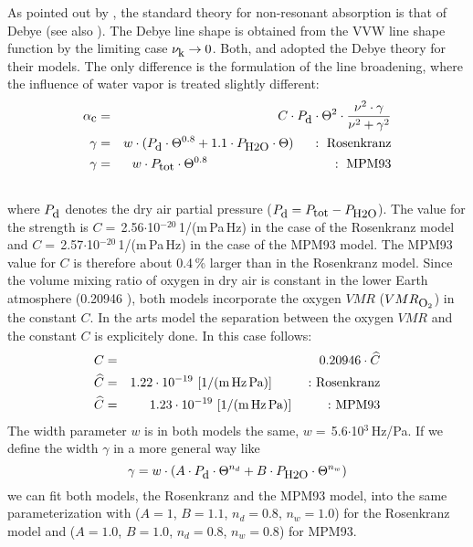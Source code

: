 \label{levelc:o2cont}
As pointed out by \citet{vv:87}, the standard theory for
non-resonant absorption is that of Debye (see also \citet{townes:55}). 
The Debye line shape is obtained from the VVW line shape function 
by the limiting case $\nu_{\mbox{\rm \small k}} \rightarrow 0$.
Both, \citet{liebeetal:93} and \citet{pwr:93} adopted the
Debye theory for their models. The only difference is the formulation
of the line broadening, where the influence of water vapor is treated 
slightly different: 
\begin{eqnarray}
  \label{eq:abs_cont_pwr_o2}
  \alphac &=&  C \cdot \pda \cdot \Theta^2 \cdot 
             \frac{\nu^2 \cdot \gamma}{\nu^2+\gamma^2}\\
  \label{eq:abs_cont_pwr_o2_1}
  \gamma &=&  w \cdot (\pda\cdot \Theta^{0.8} + 1.1 \cdot \phzo \cdot
  \Theta)\hspace*{5mm}:~\mbox{Rosenkranz}\\
  \label{eq:abs_cont_pwr_o2_2}
  \gamma &=&  w \cdot \ptot \cdot \Theta^{0.8}\hspace*{34mm}:~\mbox{MPM93}\\
\nonumber
\end{eqnarray}
where $P_{\mbox{\rm \small d}}$ denotes the dry air partial pressure ($P_{\mbox{\rm \small d}}=P_{\mbox{\rm \small tot}}-P_{\mbox{\rm \small H2O}}$). 
The value for the strength is $C =$\,2.56$\cdot$10$^{-20}$\,1/(m\,Pa\,Hz) 
in the case of the Rosenkranz model and 
$C =$\,2.57$\cdot$10$^{-20}$\,1/(m\,Pa\,Hz) in the case of the MPM93 model.
The MPM93 value for $C$ is therefore about 0.4\,\% larger than in the 
Rosenkranz model. Since the volume mixing ratio of oxygen in dry air
is constant in the lower Earth atmosphere (0.20946 \citep{goody:95}), 
both models incorporate the oxygen $VMR$ ($VMR_{\mbox{\rm \small O}_{2}}$) in the 
constant $C$. In the arts model the separation between the oxygen
$VMR$ and the constant $C$ is explicitely done. In this case follows:
\begin{eqnarray} 
 \label{eq:o2cont_const_vmr_1}
 C &=& 0.20946 \cdot \widehat{C}\\
 \label{eq:o2cont_const_vmr_2}
 \widehat{C} &=& 1.22\cdot 10^{-19}~\mbox{[1/(m\,Hz\,Pa)]\hspace{10mm}:~Rosenkranz} \\
 \label{eq:o2cont_const_vmr_3}
 \widehat{C} &=& 1.23\cdot 10^{-19}~\mbox{[1/(m\,Hz\,Pa)]\hspace{10mm}:~MPM93} 
\end{eqnarray} 
The width parameter $w$ is in both models the same, 
$w =$\,5.6$\cdot$10$^{3}$\,Hz/Pa. If we define the width $\gamma$ in a more 
general way like
\begin{equation} 
 \label{eq:o2_cont_gamma_general}
 \gamma = w \cdot \left( A \cdot P_{\mbox{\rm \small d}}  \cdot \Theta^{n_d} + 
                   B \cdot P_{\mbox{\rm \small H2O}} \cdot \Theta^{n_w} \right) 
\end{equation}
we can fit both models, the Rosenkranz and the MPM93 model, into the 
same parameterization with ($A=1$, $B=1.1$, $n_d=0.8$, $n_w=1.0$) for 
the Rosenkranz model and ($A=1.0$, $B=1.0$, $n_d=0.8$, $n_w=0.8$) for 
MPM93.

